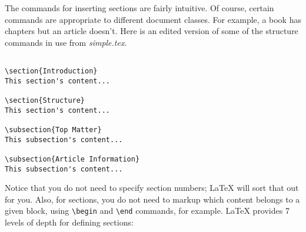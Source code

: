 The commands for inserting sections are fairly intuitive. Of course, certain commands are appropriate to different document classes. For example, a book has chapters but an article doesn't. Here is an edited version of some of the structure commands in use from \textit{simple.tex}.

\begin{lstlisting}

\section{Introduction}
This section's content...

\section{Structure}
This section's content...

\subsection{Top Matter}
This subsection's content...

\subsection{Article Information}
This subsection's content...

\end{lstlisting}


Notice that you do not need to specify section numbers; LaTeX will sort that out for you. Also, for sections, you do not need to markup which content belongs to a given block, using \lstinline{\begin} and \lstinline{\end} commands, for example. LaTeX provides 7 levels of depth for defining sections:

